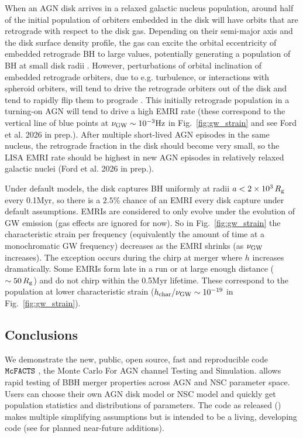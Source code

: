 When an AGN disk arrives in a relaxed galactic nucleus population, around half of the initial population of orbiters embedded in the disk will have orbits that are retrograde with respect to the disk gas. Depending on their semi-major axis and the disk surface density profile, the gas can excite the orbital eccentricity of embedded retrograde BH to large values, potentially generating a population of BH at small disk radii \citep{Secunda+21}. However, perturbations of orbital inclination of embedded retrograde orbiters, due to e.g. turbulence, or interactions with spheroid orbiters, will tend to drive the retrograde orbiters out of the disk and tend to rapidly flip them to prograde \citep{WangZhuLin24}. This initially retrograde population in a turning-on AGN will tend to drive a high EMRI rate (these correspond to the vertical line of blue points at $\nu_{\rm GW} \sim 10^{-3}{\rm Hz}$ in Fig.~\ref{fig:gw_strain} and see {Ford et al. 2026 in prep.}). After multiple short-lived AGN episodes in the same nucleus, the retrograde fraction in the disk should become very small, so the LISA EMRI rate should be highest in new AGN episodes in relatively relaxed galactic nuclei (Ford et al. 2026 in prep.).

Under default models, the disk captures BH uniformly at radii $a<2\times 10^{3}\,R_{\rm g}$ every 0.1Myr, so there is a $2.5\%$ chance of an EMRI every disk capture under default assumptions. EMRIs are considered to only evolve under the evolution of GW emission (gas effects are ignored for now). So in Fig.~\ref{fig:gw_strain} the characteristic strain per frequency (equivalently the amount of time at a monochromatic 
 GW frequency) decreases as the EMRI shrinks (as $\nu_{\rm GW}$ increases). The exception occurs during the chirp at merger where $h$ increases dramatically. Some EMRIs form late in a run or at large enough distance ($\sim 50\,R_{\rm g}$) and do not chirp within the 0.5Myr lifetime. These correspond to the population at lower characteristic strain ($h_{\rm char}/\nu_{\rm GW} \sim 10^{-19}$ in Fig.~\ref{fig:gw_strain}).
 
\subsection{Conclusions}
\label{sec:mcfacts-conclusions}

We demonstrate the new, public, open source, fast and reproducible code $\code{McFACTS}$ , the Monte Carlo For AGN channel Testing and Simulation.  allows rapid testing of BBH merger properties across AGN and NSC parameter space. Users can choose their own AGN disk model or NSC model and quickly get population statistics and distributions of parameters. The code as released () makes multiple simplifying assumptions but is intended to be a living, developing code (see  for planned near-future additions).

